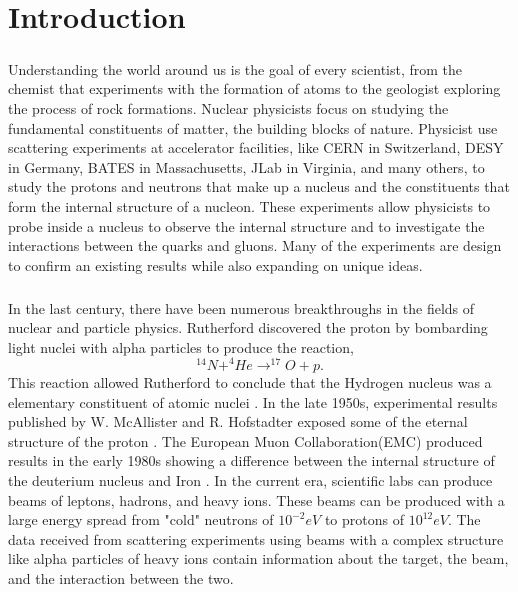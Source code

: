 
\chapter{Introduction}\paragraph{}Understanding the world around us is the goal of every scientist, from the chemist that experiments with the formation of atoms to the geologist exploring the process of rock formations. Nuclear physicists focus on studying the fundamental constituents of matter, the building blocks of nature. Physicist use scattering experiments at accelerator facilities, like CERN in Switzerland, DESY in Germany, BATES in Massachusetts, JLab in Virginia, and many others, to study the protons and neutrons that make up a nucleus and the constituents that form the internal structure of a nucleon. These experiments allow physicists to probe inside a nucleus to observe the internal structure and to investigate the interactions between the quarks and gluons. Many of the experiments are design to confirm an existing results while also expanding on unique ideas.
\paragraph{}In the last century, there have been numerous breakthroughs in the fields of nuclear and particle physics. Rutherford discovered the proton by bombarding light nuclei with alpha particles to produce the reaction,  
	\begin{equation}
	^{14}N + ^4He \rightarrow ^{17}O + p.
	\end{equation}
This reaction allowed Rutherford to conclude that the Hydrogen nucleus was a elementary constituent of atomic nuclei \cite{PnN}. In the late 1950s, experimental results published by W. McAllister and R. Hofstadter exposed some of the eternal structure of the proton \cite{Flay,Hof}. The European Muon Collaboration(EMC) produced results in the early 1980s showing a difference between the internal structure of the deuterium nucleus and Iron \cite{seeley,CC}. In the current era, scientific labs can produce beams of leptons, hadrons, and heavy ions. These beams can be produced with a large energy spread from "cold" neutrons of $10^{-2}eV$ to protons of $10^{12}eV$. The data received from scattering experiments using beams with a complex structure like alpha particles of heavy ions contain information about the target, the beam, and the interaction between the two. 
